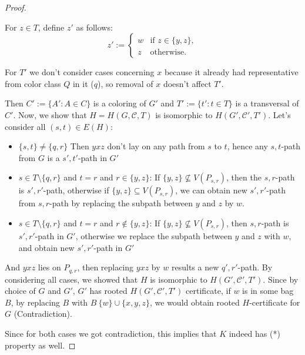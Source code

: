 \begin{proof}
\begin{itemize}
        For \( z \in T \), define \( z' \) as follows:
        \[
        z' :=
        \begin{cases}
        w & \text{if } z \in \{y, z\}, \\
        z & \text{otherwise}.
        \end{cases}
        \]

        For $T'$ we don't consider cases concerning $x$ because it already had representative from color class $Q$ in it ($q$),
        so removal of $x$ doesn't affect $T'$.
        
        Then \( C' := \{A' : A \in C\} \) is a coloring of \( G' \) and \( T' := \{t' : t \in T\} \) is a transversal of \( C' \). \newline
        Now, we show that $H = H(G, \mathcal{C}, T)$ is isomorphic to $H(G', \mathcal{C'}, T')$.
        Let's consider all $(s,t) \in E(H)$:
        \begin{itemize}
            \item  $\{s, t\} \neq \{q, r\}$
            Then $yxz$ don't lay on any path from $s$ to $t$, hence any $s, t$-path from $G$ is a $s', t'$-path in $G'$
            \item $s \in T \setminus \{q, r\}$ and $t = r$ and $r \in \{y, z\}$: \newline
            If $\{y, z\} \not\subseteq V(P_{s,r})$, then the $s,r$-path is $s',r'$-path, otherwise if $\{y, z\} \subseteq V(P_{s,r})$,
            we can obtain new $s', r'$-path from $s, r$-path by replacing the subpath between $y$ and $z$ by $w$.
            \item $s \in T \setminus \{q, r\}$ and $t = r$ and $r \not\in \{y, z\}$: \newline
            If $\{y, z\} \not\subseteq V(P_{s,r})$, then $s,r$-path is $s',r'$-path in $G'$, otherwise we replace the subpath between $y$ and $z$ with $w$,
            and obtain new $s', r'$-path in $G'$
        \end{itemize}
        And $yxz$ lies on $P_{q, r}$, then replacing $yxz$ by $w$ results a new $q',r'$-path.
        By considering all cases, we showed that $H$ is isomorphic to $H(G', \mathcal{C'}, T')$.
        Since by choice of $G$ and $G'$, $G'$ has rooted $H(G', \mathcal{C'}, T')$ certificate, if $w$ is in some bag $B$,
        by replacing $B$ with $B \ \{w\} \cup \{x, y, z\}$, we would obtain rooted $H$-certificate for $G$ (Contradiction).
    \end{itemize} 

    Since for both cases we got contradiction, this implies that $K$ indeed has (*) property as well.
\end{proof}

